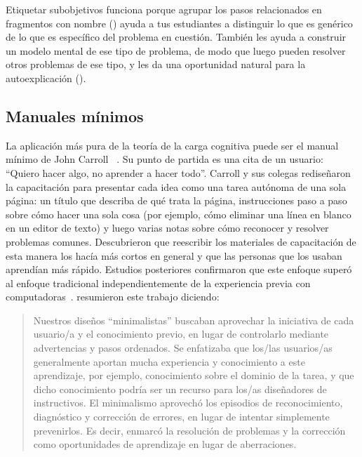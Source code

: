 Etiquetar sub\-objetivos funciona porque agrupar los pasos relacionados en fragmentos con nombre ()
ayuda a tus estudiantes a distinguir lo que es genérico de lo que es específico del problema en cuestión.
También les ayuda a construir un modelo mental de ese tipo de problema,
de modo que luego pueden resolver otros problemas de ese tipo,
y les da una oportunidad natural para la auto\-explicación ().

\subsection*{Manuales mínimos}

La aplicación más pura de la teoría de la carga cognitiva puede ser el manual mínimo de
John Carroll ~\cite{Carr1987,Carr2014}.
Su punto de partida es una cita de un usuario: ``Quiero hacer algo, no aprender a hacer todo''.
Carroll y sus colegas rediseñaron la capacitación para presentar cada idea como una tarea autónoma de una sola página:
un título que describa de qué trata la página,
instrucciones paso a paso sobre cómo hacer una sola cosa
(por ejemplo, cómo eliminar una línea en blanco en un editor de texto)
y luego varias notas sobre cómo reconocer y resolver problemas comunes.
Descubrieron que reescribir los materiales de capacitación de esta manera los hacía más cortos en general
y que las personas que los usaban aprendían más rápido.
Estudios posteriores confirmaron que este enfoque superó al enfoque tradicional
independientemente de la experiencia previa con computadoras~\cite{Lazo1993}.
\cite{Carr2014} resumieron este trabajo diciendo:

\begin{quote}

  Nuestros diseños ``minimalistas'' buscaban aprovechar la iniciativa de cada usuario/a y el conocimiento previo,
  en lugar de controlarlo mediante advertencias y pasos ordenados.
  Se enfatizaba que los/las usuarios/as generalmente aportan mucha experiencia y conocimiento a este aprendizaje,
  por ejemplo,
  conocimiento sobre el dominio de la tarea,
  y que dicho conocimiento podría ser un recurso para los/as diseñadores de instructivos.
  El minimalismo aprovechó los episodios de reconocimiento, diagnóstico y corrección de errores,
  en lugar de intentar simplemente prevenirlos. Es decir,
  enmarcó la resolución de problemas y la corrección como oportunidades de aprendizaje en lugar de aberraciones.

\end{quote}



